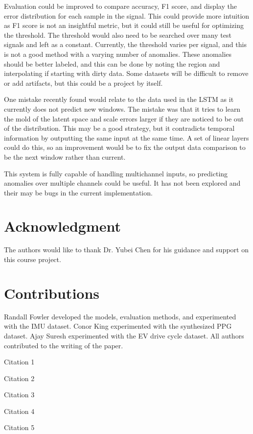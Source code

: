 \documentclass[conference]{IEEEtran}
\begin{document}
Evaluation could be improved to compare accuracy, F1 score, and display the error distribution for each sample in the signal. This could provide more intuition as F1 score is not an insightful metric, but it could still be useful for optimizing the threshold. The threshold would also need to be searched over many test signals and left as a constant. Currently, the threshold varies per signal, and this is not a good method with a varying number of anomalies. These anomalies should be better labeled, and this can be done by noting the region and interpolating if starting with dirty data. Some datasets will be difficult to remove or add artifacts, but this could be a project by itself.

One mistake recently found would relate to the data used in the LSTM as it currently does not predict new windows. The mistake was that it tries to learn the mold of the latent space and scale errors larger if they are noticed to be out of the distribution. This may be a good strategy, but it contradicts temporal information by outputting the same input at the same time. A set of linear layers could do this, so an improvement would be to fix the output data comparison to be the next window rather than current.

This system is fully capable of handling multichannel inputs, so predicting anomalies over multiple channels could be useful. It has not been explored and their may be bugs in the current implementation.


\section*{Acknowledgment}
The authors would like to thank Dr. Yubei Chen for his guidance and support on this course project.

\section*{Contributions}
Randall Fowler developed the models, evaluation methods, and experimented with the IMU dataset. 
Conor King experimented with the synthesized PPG dataset. 
Ajay Suresh experimented with the EV drive cycle dataset. 
All authors contributed to the writing of the paper.

\begin{thebibliography}{1}


Citation 1

Citation 2

Citation 3

Citation 4

Citation 5

\end{thebibliography}
\end{document}
